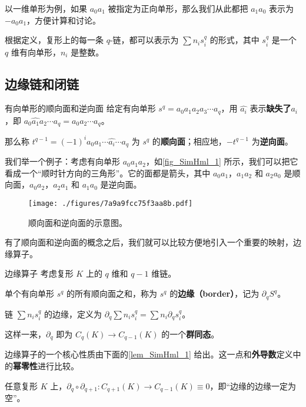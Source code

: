 以一维单形为例，如果 $a_0a_1$ 被指定为正向单形，那么我们从此都把 $a_1a_0$ 表示为 $-a_0a_1$，方便计算和讨论。

根据定义，复形上的每一条 $q$-链，都可以表示为 $\sum n_is^q_i$ 的形式，其中 $s^q_i$ 是一个 $q$ 维有向单形，$n_i$ 是整数。

\subsection{边缘链和闭链}

\begin{definition}{有向单形的顺向面和逆向面}
给定有向单形 $s^q=a_0a_1a_2a_3\cdots a_q$，用 $\hat{a_i}$ 表示\textbf{缺失了}$a_i$，即 $a_0\hat{a_1}a_2\cdots a_q=a_0a_2\cdots a_q$。

那么称 $t^{q-1}=(-1)^ia_0a_1\cdots\hat{a_i}\cdots a_q$ 为 $s^q$ 的\textbf{顺向面}；相应地，$-t^{q-1}$ 为\textbf{逆向面}。
\end{definition}

我们举一个例子：考虑有向单形 $a_0a_1a_2$，如\autoref{fig_SimHml_1} 所示，我们可以把它看成一个“顺时针方向的三角形”。它的面都是箭头，其中 $a_0a_1$，$a_1a_2$ 和 $a_2a_0$ 是顺向面，$a_0a_2$，$a_2a_1$ 和 $a_1a_0$ 是逆向面。

\begin{figure}[ht]
\centering
\texttt{[image: ./figures/7a9a9fcc75f3aa8b.pdf]}
\caption{顺向面和逆向面的示意图。} \label{fig_SimHml_1}
\end{figure}

有了顺向面和逆向面的概念之后，我们就可以比较方便地引入一个重要的映射，边缘算子。

\begin{definition}{边缘算子}
考虑复形 $K$ 上的 $q$ 维和 $q-1$ 维链。

单个有向单形 $s^q$ 的所有顺向面之和，称为 $s^q$ 的\textbf{边缘（border）}，记为 $\partial_q S^q$。

链 $\sum n_is^q_i$ 的边缘，定义为 $\partial_q \sum n_is^q_i=\sum n_i\partial_qs^q_i$。

这样一来，$\partial_q$ 即为 $C_q(K)\to C_{q-1}(K)$ 的一个\textbf{群同态}。
\end{definition}

边缘算子的一个核心性质由下面的\autoref{lem_SimHml_1} 给出。这一点和\textbf{外导数}定义中的\textbf{幂零性}进行比较。

\begin{lemma}{}\label{lem_SimHml_1}
任意复形 $K$ 上，$\partial_q\circ\partial_{q+1}:C_{q+1}(K)\to C_{q-1}(K)\equiv 0$，即“边缘的边缘一定为空”。
\end{lemma}

